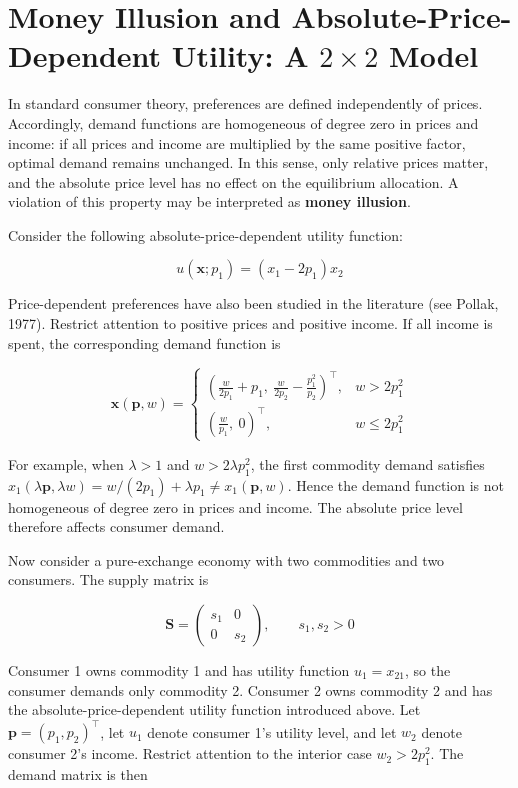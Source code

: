 \documentclass[
  letterpaper,
  DIV=11,
  numbers=noendperiod]{scrreprt}
\begin{document}
\section{\texorpdfstring{Money Illusion and Absolute-Price-Dependent
Utility: A \(2\times2\)
Model}{Money Illusion and Absolute-Price-Dependent Utility: A 2\textbackslash times2 Model}}\label{money-illusion-and-absolute-price-dependent-utility-a-2times2-model}

In standard consumer theory, preferences are defined independently of
prices. Accordingly, demand functions are homogeneous of degree zero in
prices and income: if all prices and income are multiplied by the same
positive factor, optimal demand remains unchanged. In this sense, only
relative prices matter, and the absolute price level has no effect on
the equilibrium allocation. A violation of this property may be
interpreted as \textbf{money illusion}.

Consider the following absolute-price-dependent utility function:

\[
u(\mathbf x;p_1)=(x_1-2p_1)x_2
\]

Price-dependent preferences have also been studied in the literature
(see Pollak, 1977). Restrict attention to positive prices and positive
income. If all income is spent, the corresponding demand function is

\[
\mathbf x(\mathbf p,w)=
\begin{cases}
\left(\frac{w}{2p_1}+p_1,\ \frac{w}{2p_2}-\frac{p_1^2}{p_2}\right)^\top,
& w>2p_1^2\\[0.8em]
\left(\frac{w}{p_1},\ 0\right)^\top,
& w\leq2p_1^2
\end{cases}
\]

For example, when \(\lambda>1\) and \(w>2\lambda p_1^2\), the first
commodity demand satisfies
\(x_1(\lambda\mathbf p,\lambda w)=w/(2p_1)+\lambda p_1\neq x_1(\mathbf p,w)\).
Hence the demand function is not homogeneous of degree zero in prices
and income. The absolute price level therefore affects consumer demand.

Now consider a pure-exchange economy with two commodities and two
consumers. The supply matrix is

\[
\mathbf S=
\begin{pmatrix}
s_1&0\\
0&s_2
\end{pmatrix},
\qquad s_1,s_2>0
\]

Consumer 1 owns commodity 1 and has utility function \(u_1=x_{21}\), so
the consumer demands only commodity 2. Consumer 2 owns commodity 2 and
has the absolute-price-dependent utility function introduced above. Let
\(\mathbf p=(p_1,p_2)^\top\), let \(u_1\) denote consumer 1's utility
level, and let \(w_2\) denote consumer 2's income. Restrict attention to
the interior case \(w_2>2p_1^2\). The demand matrix is then
\end{document}
